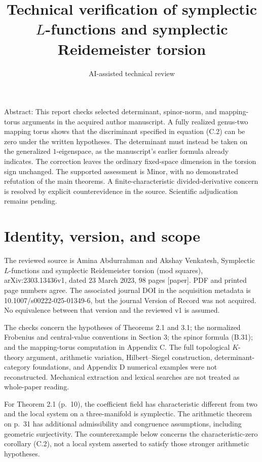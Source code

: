 \documentclass[10pt]{article}
\title{Technical verification of symplectic \(L\)-functions and symplectic Reidemeister torsion}
\author{AI-assisted technical review}
\date{}
\begin{document}
\maketitle
Abstract: This report checks selected determinant, spinor-norm, and mapping-torus arguments in the acquired author manuscript. A fully realized genus-two mapping torus shows that the discriminant specified in equation (C.2) can be zero under the written hypotheses. The determinant must instead be taken on the generalized \(1\)-eigenspace, as the manuscript’s earlier formula already indicates. The correction leaves the ordinary fixed-space dimension in the torsion sign unchanged. The supported assessment is Minor, with no demonstrated refutation of the main theorems. A finite-characteristic divided-derivative concern is resolved by explicit counterevidence in the source. Scientific adjudication remains pending.\par
\section*{Identity, version, and scope}
The reviewed source is Amina Abdurrahman and Akshay Venkatesh, Symplectic \(L\)-functions and symplectic Reidemeister torsion (mod squares), arXiv:2303.13436v1, dated 23 March 2023, 98 pages [paper]. PDF and printed page numbers agree. The associated journal DOI in the acquisition metadata is 10.1007/s00222-025-01349-6, but the journal Version of Record was not acquired. No equivalence between that version and the reviewed v1 is assumed.\par
The checks concern the hypotheses of Theorems 2.1 and 3.1; the normalized Frobenius and central-value conventions in Section 3; the spinor formula (B.31); and the mapping-torus computation in Appendix C. The full topological \(K\)-theory argument, arithmetic variation, Hilbert–Siegel construction, determinant-category foundations, and Appendix D numerical examples were not reconstructed. Mechanical extraction and lexical searches are not treated as whole-paper reading.\par
For Theorem 2.1 (p. 10), the coefficient field has characteristic different from two and the local system on a three-manifold is symplectic. The arithmetic theorem on p. 31 has additional admissibility and congruence assumptions, including geometric surjectivity. The counterexample below concerns the characteristic-zero corollary (C.2), not a local system asserted to satisfy those stronger arithmetic hypotheses.\par
\end{document}
